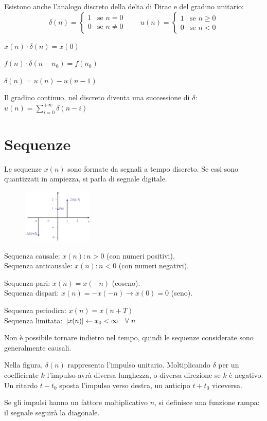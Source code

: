 Esistono anche l'analogo discreto della delta di Dirac e del gradino unitario:
$$\delta(n) = \begin{cases}
1 & \text{se } n = 0 \\
0 & \text{se } n \neq 0
\end{cases}
\qquad
u(n) = \begin{cases}
1 & \text{se } n \geq 0 \\
0 & \text{se } n < 0
\end{cases}$$

$x(n) \cdot \delta(n) = x(0) $ 

$f(n) \cdot \delta(n - n_0) = f(n_0)$ 

$\delta(n) = u(n) - u(n - 1)$

Il gradino continuo, nel discreto diventa una successione di $\delta$: $u(n) = \sum_{i=0}^{+\infty} \delta(n - i)$ 

\section{Sequenze}
Le sequenze $x(n)$ sono formate da segnali a tempo discreto. Se essi sono quantizzati in ampiezza, si parla di segnale digitale. 

\begin{figure}
	\vspace{-15pt}
	\begin{center}
		\includegraphics[width=0.3\textwidth]{Lezioni/Immagini/impulso}
	\end{center}
	\vspace{-20pt}
\end{figure}

Sequenza causale: $x(n) : n > 0$ (con numeri positivi). \\
Sequenza anticausale: $x(n) : n < 0$ (con numeri negativi).

Sequenza pari: $x(n) = x(-n)$ (coseno). \\
Sequenza dispari: $x(n) = -x(-n) \rightarrow x(0) = 0$ (seno).

Sequenza periodica: $x(n) = x(n + T)$ \\
Sequenza limitata: $\left|x(n)\right| \leftarrow x_0 < \infty \quad \forall\ n$

Non è possibile tornare indietro nel tempo, quindi le sequenze considerate sono generalmente causali. 

Nella figura, $\delta(n)$ rappresenta l'impulso unitario. Moltiplicando $\delta$ per un coefficiente $k$ l'impulso avrà diversa lunghezza, o diversa direzione se $k$ è negativo. \\
Un ritardo $t - t_0$ sposta l'impulso verso destra, un anticipo $t + t_0$ viceversa.

Se gli impulsi hanno un fattore moltiplicativo $n$, si definisce una funzione rampa: il segnale seguirà la diagonale. 
